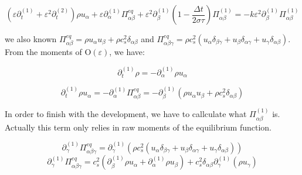 \documentclass{article}
\newcommand{\Omicron}{\mathrm{O}}
\begin{document}
\begin{equation*}
    \left( \varepsilon \partial _{t}^{( 1)} +\varepsilon ^{2} \partial _{t}^{( 2)}\right) \rho u_{\alpha } +\varepsilon \partial _{\alpha }^{( 1)} \Pi _{\alpha \beta }^{eq} +\varepsilon ^{2} \partial _{\beta }^{( 1)}\left( 1-\frac{\Delta t}{2\sigma \tau }\right) \Pi _{\alpha \beta }^{( 1)} =-k\varepsilon ^{2}\partial _{\beta }^{( 1)}\mathit{\Pi }_{\alpha \beta }^{( 1)}
\end{equation*}

we also known $\Pi _{\alpha \beta }^{eq} =\rho u_{\alpha } u_{\beta } +\rho c_{s}^{2} \delta _{\alpha \beta }$ and $\Pi _{\alpha \beta \gamma }^{eq} =\rho c_{s}^{2}( u_{\alpha } \delta _{\beta \gamma } +u_{\beta } \delta _{\alpha \gamma } +u_{\gamma } \delta _{\alpha \beta })$.
From the moments of $\Omicron(\varepsilon)$, we have:

\begin{equation*}
    \partial _{t}^{( 1)} \rho =-\partial _{\alpha }^{( 1)} \rho u_{\alpha }
\end{equation*}

\begin{equation*}
    \partial _{t}^{( 1)} \rho u_{\alpha } =-\partial _{\alpha }^{( 1)}\mathit{\Pi }_{\alpha \beta }^{eq} =-\partial _{\beta }^{( 1)}\left( \rho u_{\alpha } u_{\beta } +\rho c_{s}^{2} \delta _{\alpha \beta }\right)
\end{equation*}

In order to finish with the development, we have to callculate what $\Pi _{\alpha \beta }^{( 1)}$ is.  Actually this term only relies in raw moments of the equilibrium function.

\begin{equation*}
    \partial _{\gamma }^{( 1)} \Pi _{\alpha \beta \gamma }^{eq} =\partial _{\gamma }^{( 1)}\left( \rho c_{s}^{2}( u_{\alpha } \delta _{\beta \gamma } +u_{\beta } \delta _{\alpha \gamma } +u_{\gamma } \delta _{\alpha \beta })\right)
\end{equation*}
\begin{equation*}
    \partial _{\gamma }^{( 1)} \Pi _{\alpha \beta \gamma }^{eq}=c_{s}^{2}\left( \partial _{\beta }^{( 1)} \rho u_{\alpha } +\partial _{\alpha }^{( 1)} \rho u_{\beta }\right) +c_{s}^{2} \delta _{\alpha \beta } \partial _{\gamma }^{( 1)}( \rho u_{\gamma })
\end{equation*}
\end{document}
